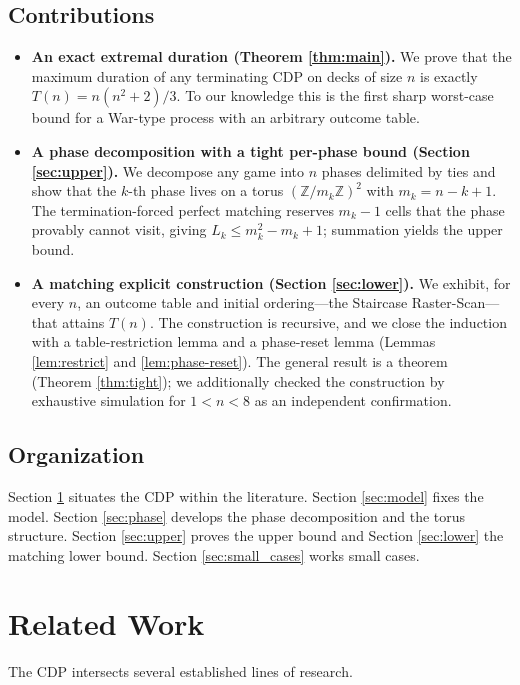 \documentclass[11pt]{article}
\theoremstyle{definition}
\theoremstyle{remark}
\begin{document}
\subsection{Contributions}
\begin{itemize}[leftmargin=1.4em]
    \item \textbf{An exact extremal duration (Theorem \ref{thm:main}).} We prove that the maximum duration of any terminating CDP on decks of size $n$ is exactly $T(n)=n(n^2+2)/3$. To our knowledge this is the first sharp worst-case bound for a War-type process with an arbitrary outcome table.
    
    \item \textbf{A phase decomposition with a tight per-phase bound (Section \ref{sec:upper}).} We decompose any game into $n$ phases delimited by ties and show that the $k$-th phase lives on a torus $(\mathbb{Z}/m_k\mathbb{Z})^2$ with $m_k=n-k+1$. The termination-forced perfect matching reserves $m_k-1$ cells that the phase provably cannot visit, giving $L_k \le m_k^2-m_k+1$; summation yields the upper bound.
    
    \item \textbf{A matching explicit construction (Section \ref{sec:lower}).} We exhibit, for every $n$, an outcome table and initial ordering---the Staircase Raster-Scan---that attains $T(n)$. The construction is recursive, and we close the induction with a table-restriction lemma and a phase-reset lemma (Lemmas \ref{lem:restrict} and \ref{lem:phase-reset}). The general result is a theorem (Theorem \ref{thm:tight}); we additionally checked the construction by exhaustive simulation for $1 < n < 8$ as an independent confirmation.
\end{itemize}

\subsection{Organization}
Section \ref{sec:related} situates the CDP within the literature. Section \ref{sec:model} fixes the model. Section \ref{sec:phase} develops the phase decomposition and the torus structure. Section \ref{sec:upper} proves the upper bound and Section \ref{sec:lower} the matching lower bound. Section \ref{sec:small_cases} works small cases.

\section{Related Work}\label{sec:related}
The CDP intersects several established lines of research.
\end{document}
